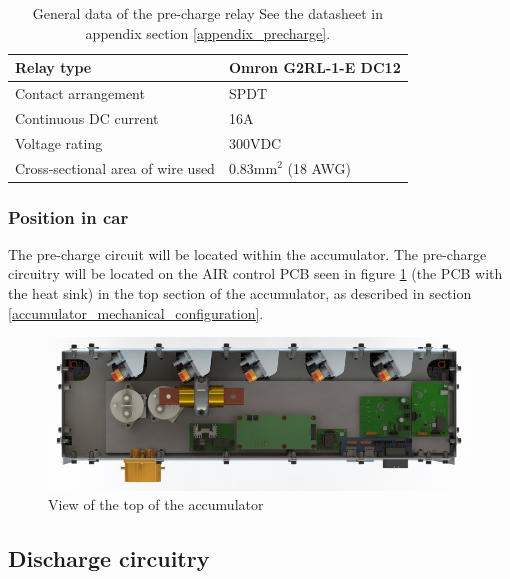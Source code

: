 \documentclass{article}
\begin{document}
	\begin{table}[H]
	    \centering
	    \begin{tabular}{|l|l|}
	    \hline
	    Relay type & Omron G2RL-1-E DC12 \\ \hline
	    Contact arrangement & SPDT \\ \hline
	    Continuous DC current & 16A \\ \hline
	    Voltage rating & 300VDC \\ \hline
	    Cross-sectional area of wire used & 0.83mm$^2$ (18 AWG) \\ \hline
	    \end{tabular}
	    \caption{General data of the pre-charge relay See the datasheet in appendix section \ref{appendix_precharge}.}
	    \label{PCrelay}
	\end{table}

\subsubsection{Position in car}
The pre-charge circuit will be located within the accumulator. The pre-charge circuitry will be located on the AIR control PCB seen in figure \ref{fig:accumulator_top_view_2} (the PCB with the heat sink) in the top section of the accumulator, as described in section \ref{accumulator_mechanical_configuration}.

\begin{figure}[H]
    \centering 
    \includegraphics[width=1\textwidth]{Accum_top_view.jpg}
    \caption{View of the top of the accumulator}
    \label{fig:accumulator_top_view_2}
\end{figure}

\subsection{Discharge circuitry}\label{discharge_circuitry}
\end{document}
